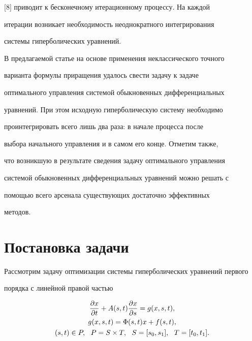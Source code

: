 [8] приводит к бесконечному итерационному процессу. На каждой


итерации возникает необходимость неоднократного интегрирования


системы гиперболических уравнений.





В предлагаемой статье на основе применения неклассического точного


варианта формулы приращения удалось свести задачу к задаче


оптимального управления системой обыкновенных дифференциальных


уравнений. При этом исходную гиперболическую систему необходимо


проинтегрировать всего лишь два раза: в начале процесса после


выбора начального управления и в самом его конце. Отметим также,


что возникшую в результате сведения задачу оптимального управления


системой обыкновенных дифференциальных уравнений можно решать с


помощью всего арсенала существующих достаточно эффективных


методов.








\section{Постановка задачи}





Рассмотрим задачу оптимизации системы гиперболических уравнений первого


порядка с линейной правой частью


\begin{gather}


\frac{\partial x}{\partial t} +


A(s,t)\frac{\partial x}{\partial s}= g(x,s,t), \\


%


g(x,s,t) = \Phi (s,t) x + f(s,t),\notag \\


%


(s,t)\in P,\ \ P=S\times T,\ \ S=[s_0,s_1],\ \ T=[t_0,t_1].\notag


\end{gather}


